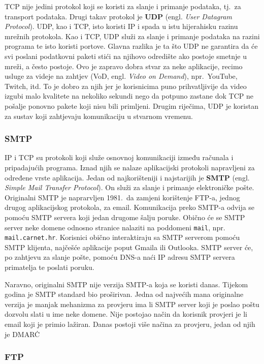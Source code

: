 TCP nije jedini protokol koji se koristi za slanje i primanje podataka, tj.\ za transport podataka.
Drugi takav protokol je \textbf{UDP} (engl. \textit{User Datagram Protocol}).
UDP, kao i TCP, isto koristi IP i spada u istu hijerahisku razinu mrežnih protokola.
Kao i TCP, UDP služi za slanje i primanje podataka na razini programa te isto koristi portove.
Glavna razlika je ta što UDP ne garantira da će svi poslani podatkovni paketi stići na njihovo odredište ako postoje smetnje u mreži, a često postoje.
Ovo je zapravo dobra stvar za neke aplikacije, recimo usluge za videje na zahtjev (VoD, engl. \textit{Video on Demand}), npr.\ YouTube, Twitch, itd.
To je dobro za njih jer je korisnicima puno prihvatljivije da video izgubi malo kvalitete na nekoliko sekundi nego da potpuno zastane dok TCP ne pošalje ponovno pakete koji nisu bili primljeni.
Drugim riječima, UDP je koristan za sustav koji zahtjevaju komunikaciju u stvarnom vremenu.

\subsubsection{SMTP}

IP i TCP su protokoli koji služe osnovnoj komunikaciji između računala i pripadajućih programa.
Iznad njih se nalaze aplikacijski protokoli napravljeni za određene vrste aplikacija.
Jedan od najkorišteniji i najstarijih je \textbf{SMTP} (engl. \textit{Simple Mail Transfer Protocol}).
On služi za slanje i primanje elektroničke pošte.
Originalni SMTP je naprarvljen 1981.\ da zamjeni korištenje FTP-a, jednog drugog aplikacijskog protokola, za email.
Komunikacija preko SMTP-a odvija se pomoću SMTP servera koji jedan drugome šalju poruke.
Obično će se SMTP server neke domene odnosno stranice nalaziti na poddomeni \verb|mail|, npr. \verb|mail.carnet.hr|.
Korisnici obično interaktiraju sa SMTP serverom pomoću SMTP klijenta, najčešće aplikacije poput Gmaila ili Outlooka.
SMTP server će, po zahtjevu za slanje pošte, pomoću DNS-a naći IP adresu SMTP servera primatelja te poslati poruku.

Naravno, originalni SMTP nije verzija SMTP-a koja se koristi danas.
Tijekom godina je SMTP standard bio proširivan.
Jedna od najvećih mana originalne verzija je manjak mehanizma za provjeru ima li SMTP server koji je poslao poštu dozvolu slati u ime neke domene.
Nije postojao način da korisnik provjeri je li email koji je primio lažiran.
Danas postoji više načina za provjeru, jedan od njih je DMARC\.

\subsubsection{FTP}

